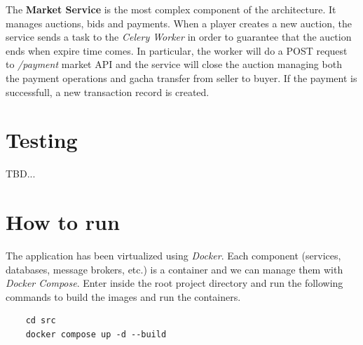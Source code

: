 \documentclass{article}
\begin{document}
The \textbf{Market Service} is the most complex component of the architecture. It manages auctions, bids and payments. When a player creates a new auction, the service sends a task to the \emph{Celery Worker} in order to guarantee that the auction ends when expire time comes. In particular, the worker will do a POST request to \emph{/payment} market API and the service will close the auction managing both the payment operations and gacha transfer from seller to buyer. If the payment is successfull, a new transaction record is created.

\section{Testing}
TBD...

\newpage
\section{How to run}
The application has been virtualized using \emph{Docker}. Each component (services, databases, message brokers, etc.) is a container and we can manage them with \emph{Docker Compose}. Enter inside the root project directory and run the following commands to build the images and run the containers.
\begin{verbatim}
    cd src
    docker compose up -d --build
\end{verbatim}
\end{document}
